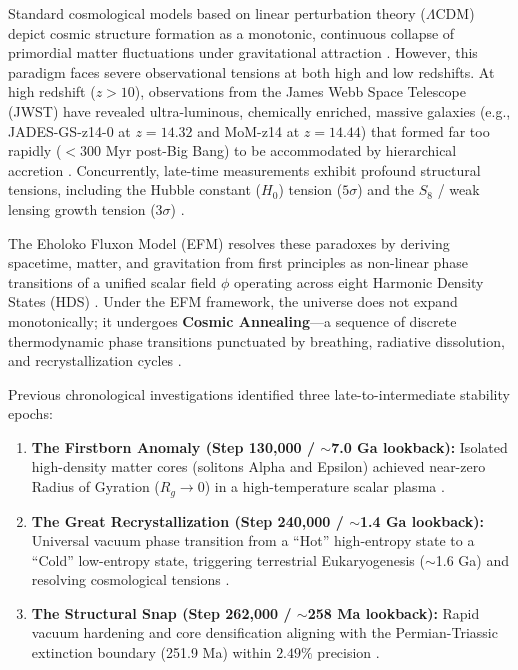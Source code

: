 \documentclass[11pt, twoside]{article}
\begin{document}
Standard cosmological models based on linear perturbation theory ($\Lambda\text{CDM}$) depict cosmic structure formation as a monotonic, continuous collapse of primordial matter fluctuations under gravitational attraction \citep{planck2018}. However, this paradigm faces severe observational tensions at both high and low redshifts. At high redshift ($z > 10$), observations from the James Webb Space Telescope (JWST) have revealed ultra-luminous, chemically enriched, massive galaxies (e.g., JADES-GS-z14-0 at $z=14.32$ and MoM-z14 at $z=14.44$) that formed far too rapidly ($<300$ Myr post-Big Bang) to be accommodated by hierarchical accretion \citep{carniani2024jades, labbe2023jwst}. Concurrently, late-time measurements exhibit profound structural tensions, including the Hubble constant ($H_0$) tension ($5\sigma$) and the $S_8$ / weak lensing growth tension ($3\sigma$) \citep{riess2022hubble, des2022y3}.

The Eholoko Fluxon Model (EFM) resolves these paradoxes by deriving spacetime, matter, and gravitation from first principles as non-linear phase transitions of a unified scalar field $\phi$ operating across eight Harmonic Density States (HDS) \citep{emvula2025engine, emvula2025foundational}. Under the EFM framework, the universe does not expand monotonically; it undergoes \textbf{Cosmic Annealing}---a sequence of discrete thermodynamic phase transitions punctuated by breathing, radiative dissolution, and recrystallization cycles \citep{emvula2026chronology}.

Previous chronological investigations identified three late-to-intermediate stability epochs:
\begin{enumerate}[leftmargin=*]
    \item \textbf{The Firstborn Anomaly (Step 130,000 / $\sim$7.0 Ga lookback):} Isolated high-density matter cores (solitons Alpha and Epsilon) achieved near-zero Radius of Gyration ($R_g \to 0$) in a high-temperature scalar plasma \citep{emvula2026chronology}.
    \item \textbf{The Great Recrystallization (Step 240,000 / $\sim$1.4 Ga lookback):} Universal vacuum phase transition from a ``Hot'' high-entropy state to a ``Cold'' low-entropy state, triggering terrestrial Eukaryogenesis ($\sim$1.6 Ga) and resolving cosmological tensions \citep{emvula2026chronology}.
    \item \textbf{The Structural Snap (Step 262,000 / $\sim$258 Ma lookback):} Rapid vacuum hardening and core densification aligning with the Permian-Triassic extinction boundary (251.9 Ma) within $2.49\%$ precision \citep{emvula2026chronology, erwin2006extinction}.
\end{enumerate}
\end{document}

